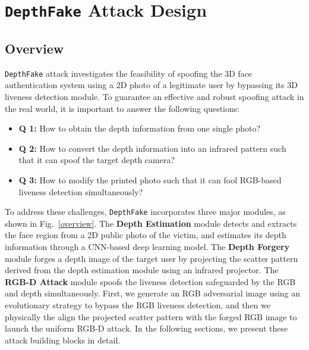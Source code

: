 \section{\texttt{DepthFake} Attack Design}

\subsection{Overview}
\texttt{DepthFake} attack investigates the feasibility of spoofing the 3D face authentication system using a 2D photo of a legitimate user by bypassing its 3D liveness detection module. 
To guarantee an effective and robust spoofing attack in the real world, it is important to answer the following  questions:

\begin{itemize}
	\item \textbf{Q 1:} 
	How to obtain the depth information from one single photo?
	\item \textbf{Q 2:} 
	How to convert the depth information into an infrared pattern such that it can spoof the target depth camera?
	\item \textbf{Q 3:} 
	How to modify the printed photo such that it can fool RGB-based liveness detection simultaneously?

\end{itemize}

To address these challenges, \texttt{DepthFake} incorporates three major modules, as shown in Fig.~\ref{overview}. 
The \textbf{Depth Estimation} module detects and extracts the face region from a 2D public photo of the victim, and estimates its depth information through a CNN-based deep learning model. 
The \textbf{Depth Forgery} module forges a depth image of the target user by projecting the scatter pattern derived from the depth estimation module using an infrared projector.
The \textbf{RGB-D Attack} module spoofs the liveness detection safeguarded by the RGB and depth simultaneously. First, we generate an RGB adversarial image using an evolutionary strategy to bypass the RGB liveness detection, and then we physically the align the projected scatter pattern with the forged RGB image to launch the uniform RGB-D attack.
In the following sections, we present these attack building blocks in detail.

